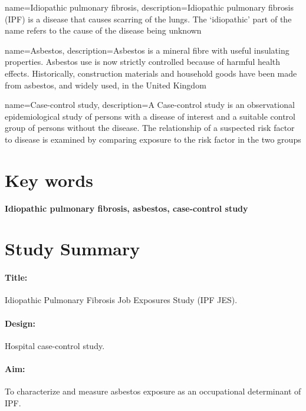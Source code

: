 \documentclass[a4paper,10pt]{article}
\begin{document}
\newpage
 
\tableofcontents

\newpage

  {name=Idiopathic pulmonary fibrosis,
  description={Idiopathic pulmonary fibrosis (IPF) is a disease that causes scarring of the lungs. The `idiopathic' part of the name refers to the cause of the disease being unknown}}


{name=Asbestos,
 description={Asbestos is a mineral fibre with useful insulating properties. Asbestos use is now strictly controlled because of harmful health effects. Historically, construction materials and household goods have been made from asbestos, and widely used, in the United Kingdom}}

{name=Case-control study,
 description={A Case-control study is an observational epidemiological study of persons with a disease of interest and a suitable control group of persons without the disease. The relationship of a suspected risk factor to disease is examined by comparing exposure to the risk factor in the two groups}}


\glsaddall

\printglossary[nonumberlist]

\section*{Key words}

\textbf{Idiopathic pulmonary fibrosis, asbestos, case-control study}

\newpage

\section*{Study Summary}

\paragraph{Title:} Idiopathic Pulmonary Fibrosis Job Exposures Study (IPF JES).
\paragraph{Design:} Hospital case-control study.
\paragraph{Aim:} To characterize and measure asbestos exposure as an occupational determinant of IPF.
\end{document}
